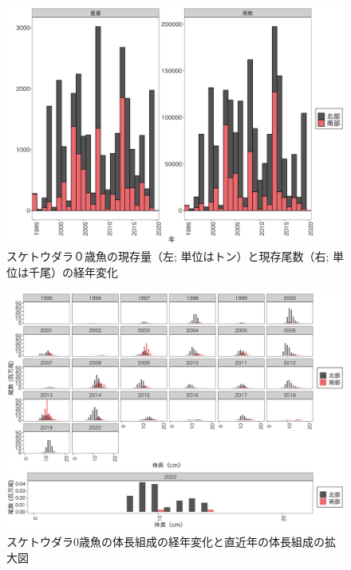 \documentclass[11pt]{article} %
\begin{document}
\begin{linenumbers}
\begin{figure}[h]
  \centering
  \includegraphics[width = 14cm]{スケトウダラ０＋trend.png}
  \caption{スケトウダラ０歳魚の現存量（左; 単位はトン）と現存尾数（右; 単位は千尾）の経年変化}
\end{figure}

\begin{figure}[h]
  \centering
  \includegraphics[width = 14cm]{スケトウダラ0+length.png}
  \caption{スケトウダラ0歳魚の体長組成の経年変化と直近年の体長組成の拡大図}
\end{figure}


\end{linenumbers}
\end{document}
